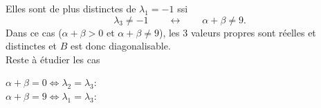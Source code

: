 \begin{enumerate}
{$$  $$
  Elles sont de plus distinctes de $\lambda_1 = -1$ ssi 
  $$
  \lambda_3 \neq -1 \qquad \leftrightarrow \qquad
  \alpha + \beta \neq 9.
  $$
  Dans ce cas ($\alpha + \beta > 0$ et $\alpha + \beta \neq 9$), les 3 valeurs propres sont réelles et distinctes et $B$ est donc diagonalisable. \\
  Reste à étudier les cas 
  \begin{description}
   \item[$\alpha + \beta = 0 \Leftrightarrow \lambda_2 = \lambda_3$:]  
   \item[$\alpha + \beta = 9 \Leftrightarrow \lambda_1 = \lambda_3$:]  
  \end{description}}
\end{enumerate}
